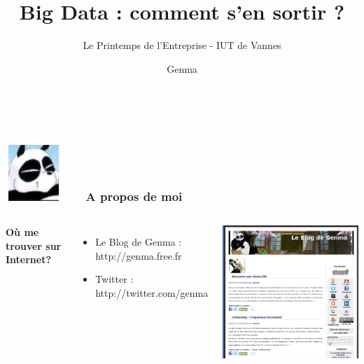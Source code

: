 \documentclass{beamer}
\title[Big Data : comment s'en sortir ?]{Big Data : comment s'en sortir ?}
\author{Le Printemps de l'Entreprise - IUT de Vannes}
\author{Genma}
\begin{document}
\begin{frame}
	\titlepage
	\vfill
	\begin{center}
		\\[2.5ex]
		{\tiny\CcNote{\CcLongnameByNcSa}}
		\vspace*{-2.5ex}
	\end{center}
\end{frame}

\begin{frame}
\frametitle{\includegraphics[scale=0.4]{./images/Genma.jpg} \ \ \  A propos de moi  }
\begin{columns}[c] 
\textbf{Où me trouver sur Internet?}
\begin{itemize}
\item Le Blog de Genma : http://genma.free.fr
\item Twitter : http://twitter.com/genma
\end{itemize}
\includegraphics[scale=0.40] {./images/blog.png} 
\end{columns}
\end{frame}
\end{document}
